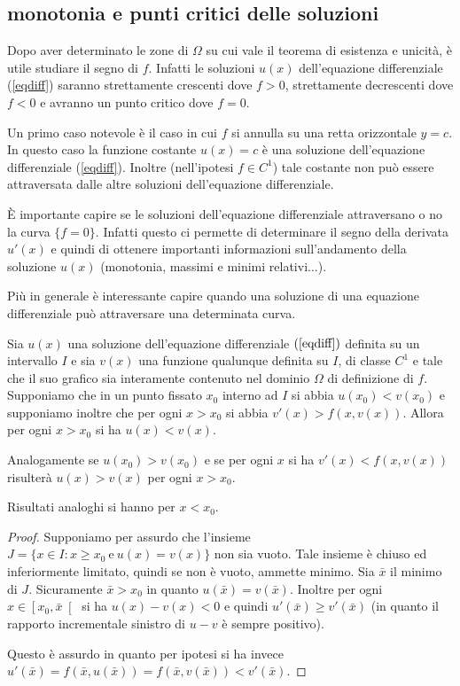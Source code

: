 \subsection{monotonia e punti critici delle soluzioni}

Dopo aver determinato le zone di $\Omega$ su cui vale il teorema di
esistenza e unicit\`a, \`e utile studiare il segno di $f$. Infatti
le soluzioni $u(x)$ dell'equazione differenziale (\ref{eqdiff})
saranno strettamente crescenti dove $f>0$, strettamente decrescenti
dove $f<0$ e avranno un punto critico dove $f=0$.

Un primo caso notevole è il caso in cui $f$ si annulla su una
retta orizzontale $y=c$.
In questo caso la funzione costante $u(x)=c$ è una
soluzione dell'equazione differenziale (\ref{eqdiff}).
Inoltre
(nell'ipotesi $f\in C^1$) tale costante non può essere
attraversata dalle altre soluzioni dell'equazione differenziale.

\`E importante capire se le soluzioni dell'equazione differenziale
attraversano o no la curva $\{f=0\}$. Infatti questo ci permette di
determinare il segno della derivata $u'(x)$ e quindi di ottenere
importanti informazioni sull'andamento della soluzione $u(x)$
(monotonia, massimi e minimi relativi...).

Più in generale è interessante capire quando una soluzione di una
equazione differenziale può attraversare una determinata curva.

\begin{theorem}\label{nonpassa}
Sia $u(x)$ una soluzione dell'equazione differenziale $(\ref{eqdiff})$
definita su un intervallo $I$ e sia $v(x)$ una funzione qualunque
definita su $I$, di classe $C^1$ e tale che il suo grafico sia
interamente contenuto nel dominio $\Omega$ di definizione di $f$.
Supponiamo che in un punto fissato $x_0$ interno ad $I$ si abbia
$u(x_0)<v(x_0)$ e supponiamo inoltre che per ogni $x>x_0$ si abbia
$v'(x)>f(x,v(x))$. Allora per ogni $x>x_0$ si ha $u(x)<v(x)$.

Analogamente se $u(x_0)>v(x_0)$ e se per ogni $x$ si ha
$v'(x)<f(x,v(x))$ risulterà $u(x)>v(x)$ per ogni $x>x_0$.

Risultati analoghi si hanno per $x<x_0$.
\end{theorem}

\begin{proof}
Supponiamo per assurdo che l'insieme $J=\{x\in I: x\ge x_0\
\mathrm{e}\ u(x)=v(x)\}$ non sia vuoto.
Tale insieme è chiuso ed
inferiormente limitato, quindi se non è vuoto, ammette minimo.
Sia $\bar x$ il minimo di $J$.
Sicuramente $\bar x>x_0$ in quanto $u(\bar
x)=v(\bar x)$.
Inoltre per ogni $x\in \left[x_0,\bar x\right[$ si ha
$u(x)-v(x)<0$ e quindi $u'(\bar x) \ge v'(\bar x)$ (in quanto
il rapporto incrementale sinistro di $u-v$ è sempre positivo).

Questo è assurdo in quanto per ipotesi si ha invece $u'(\bar x) =
f(\bar x, u(\bar x)) = f(\bar x ,v(\bar x)) < v'(\bar x)$.
\end{proof}

